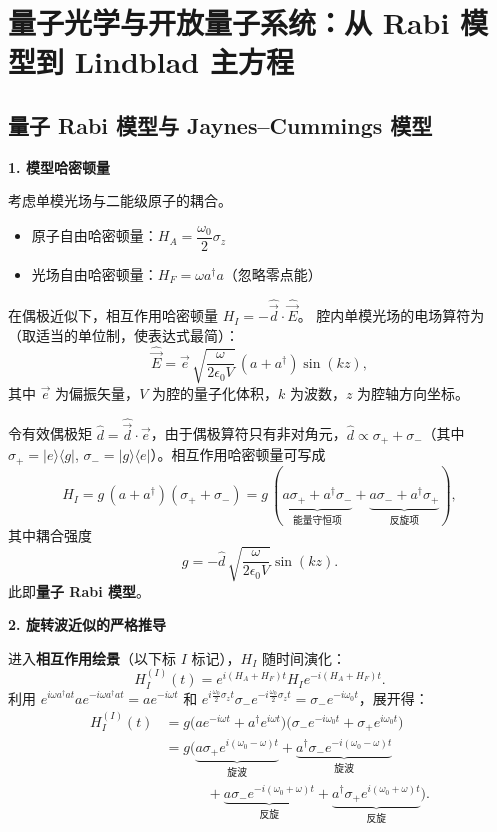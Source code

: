 \newpage
\section{量子光学与开放量子系统：从 Rabi 模型到 Lindblad 主方程}

\subsection{量子 Rabi 模型与 Jaynes--Cummings 模型}

\textbf{1. 模型哈密顿量}

考虑单模光场与二能级原子的耦合。
\begin{itemize}[nosep]
    \item 原子自由哈密顿量：$H_A = \dfrac{\omega_0}{2}\sigma_z$
    \item 光场自由哈密顿量：$H_F = \omega a^\dagger a$（忽略零点能）
\end{itemize}
在偶极近似下，相互作用哈密顿量 $H_I = -\hat{\vec{d}}\cdot\hat{\vec{E}}$。
腔内单模光场的电场算符为（取适当的单位制，使表达式最简）：
\[
\hat{\vec{E}} = \vec{e}\,\sqrt{\frac{\omega}{2\epsilon_0 V}}\,(a + a^\dagger)\sin(kz),
\]
其中 $\vec{e}$ 为偏振矢量，$V$ 为腔的量子化体积，$k$ 为波数，$z$ 为腔轴方向坐标。

令有效偶极矩 $\hat{d} = \hat{\vec{d}}\cdot\vec{e}$，由于偶极算符只有非对角元，$\hat{d} \propto \sigma_+ + \sigma_-$（其中 $\sigma_+ = |e\rangle\langle g|$, $\sigma_- = |g\rangle\langle e|$）。相互作用哈密顿量可写成
\[
H_I = g\,(a+a^\dagger)(\sigma_+ + \sigma_-)
= g\,(\underbrace{a\sigma_+ + a^\dagger\sigma_-}_{\text{能量守恒项}} + \underbrace{a\sigma_- + a^\dagger\sigma_+}_{\text{反旋项}}),
\]
其中耦合强度
\[
\boxed{g = -\hat{d}\,\sqrt{\frac{\omega}{2\epsilon_0 V}}\sin(kz)}.
\]
此即\textbf{量子 Rabi 模型}。

\textbf{2. 旋转波近似的严格推导}

进入\textbf{相互作用绘景}（以下标 $I$ 标记），$H_I$ 随时间演化：
\[
H_I^{(I)}(t) = e^{i(H_A+H_F)t} H_I e^{-i(H_A+H_F)t}.
\]
利用 $e^{i\omega a^\dagger a t} a e^{-i\omega a^\dagger a t} = a e^{-i\omega t}$ 和 $e^{i\frac{\omega_0}{2}\sigma_z t} \sigma_- e^{-i\frac{\omega_0}{2}\sigma_z t} = \sigma_- e^{-i\omega_0 t}$，展开得：
\begin{align*}
H_I^{(I)}(t) &= g\bigl( a e^{-i\omega t} + a^\dagger e^{i\omega t} \bigr)
\bigl( \sigma_- e^{-i\omega_0 t} + \sigma_+ e^{i\omega_0 t} \bigr) \\
&= g\bigl( \underbrace{a\sigma_+ e^{i(\omega_0-\omega)t}}_{\text{旋波}} + \underbrace{a^\dagger\sigma_- e^{-i(\omega_0-\omega)t}}_{\text{旋波}} \\
&\qquad\quad + \underbrace{a\sigma_- e^{-i(\omega_0+\omega)t}}_{\text{反旋}} + \underbrace{a^\dagger\sigma_+ e^{i(\omega_0+\omega)t}}_{\text{反旋}} \bigr).
\end{align*}

